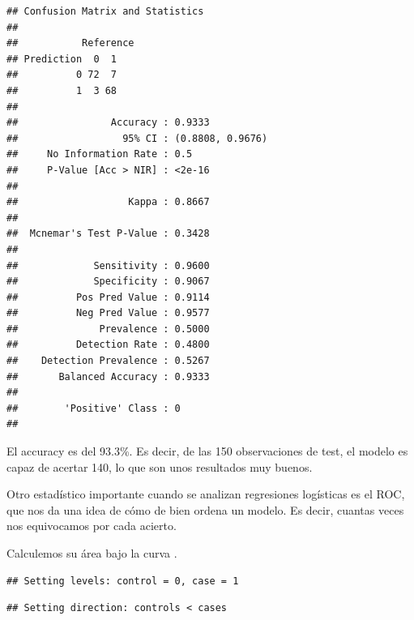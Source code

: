 \documentclass[
]{article}
\newenvironment{Shaded}{\begin{snugshade}}{\end{snugshade}}
\newcommand{\DataTypeTok}[1]{\textcolor[rgb]{0.13,0.29,0.53}{#1}}
\newcommand{\KeywordTok}[1]{\textcolor[rgb]{0.13,0.29,0.53}{\textbf{#1}}}
\newcommand{\NormalTok}[1]{#1}
\newcommand{\OperatorTok}[1]{\textcolor[rgb]{0.81,0.36,0.00}{\textbf{#1}}}
\newcommand{\OtherTok}[1]{\textcolor[rgb]{0.56,0.35,0.01}{#1}}
\newcommand{\StringTok}[1]{\textcolor[rgb]{0.31,0.60,0.02}{#1}}
\begin{document}
\begin{verbatim}
## Confusion Matrix and Statistics
## 
##           Reference
## Prediction  0  1
##          0 72  7
##          1  3 68
##                                           
##                Accuracy : 0.9333          
##                  95% CI : (0.8808, 0.9676)
##     No Information Rate : 0.5             
##     P-Value [Acc > NIR] : <2e-16          
##                                           
##                   Kappa : 0.8667          
##                                           
##  Mcnemar's Test P-Value : 0.3428          
##                                           
##             Sensitivity : 0.9600          
##             Specificity : 0.9067          
##          Pos Pred Value : 0.9114          
##          Neg Pred Value : 0.9577          
##              Prevalence : 0.5000          
##          Detection Rate : 0.4800          
##    Detection Prevalence : 0.5267          
##       Balanced Accuracy : 0.9333          
##                                           
##        'Positive' Class : 0               
## 
\end{verbatim}

El accuracy es del 93.3\%. Es decir, de las 150 observaciones de test,
el modelo es capaz de acertar 140, lo que son unos resultados muy
buenos.

Otro estadístico importante cuando se analizan regresiones logísticas es
el ROC, que nos da una idea de cómo de bien ordena un modelo. Es decir,
cuantas veces nos equivocamos por cada acierto.

Calculemos su área bajo la curva .

\begin{Shaded}
\end{Shaded}

\begin{verbatim}
## Setting levels: control = 0, case = 1
\end{verbatim}

\begin{verbatim}
## Setting direction: controls < cases
\end{verbatim}
\end{document}
